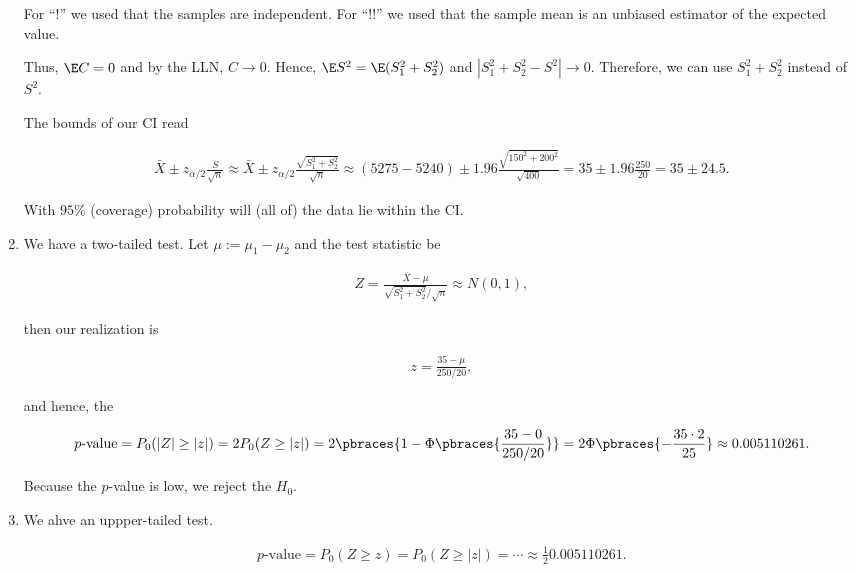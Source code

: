 \begin{solution}
\begin{enumerate}[label = (\alph*)]
    For \enquote ! we used that the samples are independent.
    For \enquote{!!} we used that the sample mean is an unbiased estimator of the expected value.

    Thus, $\E C = 0$ and by the LLN, $C \to 0$.
    Hence, $\E S^2 = \E(S_1^2 + S_2^2)$ and $|S_1^2 + S_2^2 - S^2| \to 0$.
    Therefore, we can use $S_1^2 + S_2^2$ instead of $S^2$.

    The bounds of our CI read

    \begin{align*}
        \bar X \pm z_{\alpha / 2} \frac{S}{\sqrt n}
        \approx
        \bar X \pm z_{\alpha / 2} \frac{\sqrt{S_1^2 + S_2^2}}{\sqrt n}
        \approx
        (5275 - 5240) \pm 1.96 \frac{\sqrt{150^2 + 200^2}}{\sqrt{400}}
        =
        35 \pm 1.96 \frac{250}{20}
        =
        35 \pm 24.5.
    \end{align*}

    With $95 \%$ (coverage) probability will (all of) the data lie within the CI.

    \item We have a two-tailed test.
    Let $\mu := \mu_1 - \mu_2$ and the test statistic be

    \begin{align*}
        Z = \frac{\bar X - \mu}{\sqrt{S_1^2 + S_2^2} / \sqrt n} \approx N(0, 1),
    \end{align*}

    then our realization is

    \begin{align*}
        z = \frac{35 - \mu}{250 / 20},
    \end{align*}

    and hence, the

    \begin{align*}
        \text{$p$-value}
        =
        P_0(|Z| \geq |z|)
        =
        2 P_0(Z \geq |z|)
        =
        2 \pbraces{1 - \Phi \pbraces{\frac{35 - 0}{250 / 20}}}
        =
        2 \Phi \pbraces{-\frac{35 \cdot 2}{25}}
        \approx
        0.005110261.
    \end{align*}

    Because the $p$-value is low, we reject the $H_0$.

    \item We ahve an uppper-tailed test.
    
    \begin{align*}
        \text{$p$-value}
        =
        P_0(Z \geq z)
        =
        P_0(Z \geq |z|)
        =
        \cdots
        \approx
        \frac{1}{2} 0.005110261.
    \end{align*}


\end{enumerate}
\end{solution}
